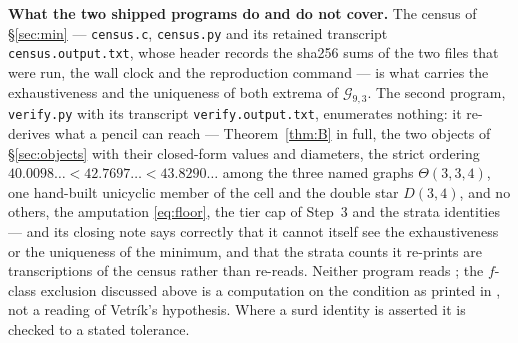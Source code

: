 \documentclass[11pt]{amsart}
\theoremstyle{remark}
\newcommand{\Gnd}{\mathcal G}
\begin{document}
\medskip
\noindent\textbf{What the two shipped programs do and do not cover.} The census
of \S\ref{sec:min} --- \texttt{census.c}, \texttt{census.py} and its retained
transcript \texttt{census.output.txt}, whose header records the sha256 sums of
the two files that were run, the wall clock and the reproduction
command --- is what carries the exhaustiveness and the uniqueness of both
extrema of $\Gnd_{9,3}$. The second program, \texttt{verify.py} with its
transcript \texttt{verify.output.txt}, enumerates nothing: it re-derives what a
pencil can reach --- Theorem~\ref{thm:B} in full, the two objects of
\S\ref{sec:objects} with their closed-form values and diameters, the strict
ordering $40.0098\ldots<42.7697\ldots<43.8290\ldots$ among the three named
graphs $\Theta(3,3,4)$, one hand-built unicyclic member of the cell and the
double star $D(3,4)$, and no others, the amputation \eqref{eq:floor}, the tier
cap of Step~3 and the strata identities
--- and its closing note says correctly that it cannot itself see the
exhaustiveness or the uniqueness of the minimum, and that the strata counts it
re-prints are transcriptions of the census rather than re-reads. Neither program
reads \cite{Vetrik}; the $f$-class exclusion discussed above is a computation on
the condition as printed in \cite{VetrikDML}, not a reading of Vetr\'ik's
hypothesis. Where a
surd identity is asserted it is checked to a stated tolerance.
\end{document}
